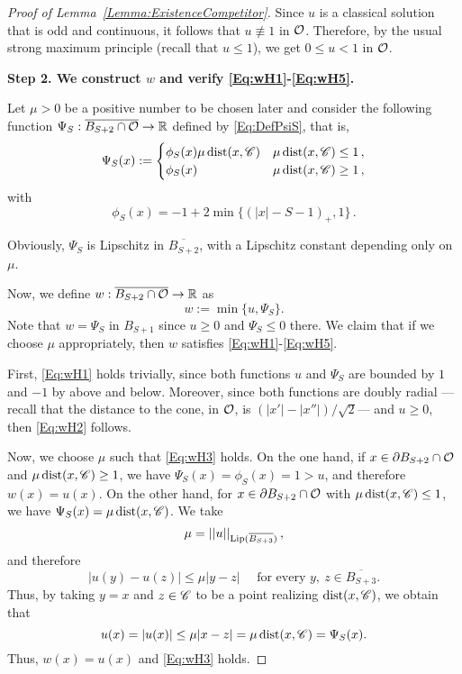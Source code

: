 \begin{proof}[Proof of Lemma~\ref{Lemma:ExistenceCompetitor}]
	Since $u$ is a classical solution that is odd and continuous, it follows that $u \not \equiv 1$ in $\mathcal{O}$. Therefore, by the usual strong maximum principle (recall that $u\leq 1$), we get $0\leq u < 1$ in $\mathcal{O}$. 
	
	\medskip
	
	\textbf{Step 2. We construct $w$ and verify \eqref{Eq:wH1}-\eqref{Eq:wH5}.} 
	
	Let $\mu>0$ be a positive number to be chosen later and consider the following function $\Psi_S:\overline{B_{S+2} \cap \mathcal{O}} \to \mathbb{R}$ defined by \eqref{Eq:DefPsiS}, that is, 
	$$
	\Psi_S(x) :=
	\begin{cases}
	\phi_S (x) \mu\operatorname{dist}(x,\mathscr{C}) &  \mu\operatorname{dist}(x,\mathscr{C}) \leq 1 \,, \\
	\phi_S (x) &  \mu\operatorname{dist}(x,\mathscr{C}) \geq 1\,,
	\end{cases}
	$$
	with 
	$$
	\phi_S (x) =-1+2\min\{(|x|-S-1)_+,1\}\,.
	$$
	
	Obviously, $\Psi_S$ is Lipschitz in $\overline{B_{S+2}}$, with a Lipschitz constant depending only on $\mu$.
	
	Now, we define $w:\overline{B_{S+2} \cap \mathcal{O}} \to \mathbb{R}$ as
	$$
	w:= \min \{u, \Psi_S\}.
	$$
	Note that $w=\Psi_S$ in $B_{S+1}$ since $u\geq 0$ and $\Psi_S\leq 0$ there.	We claim that if we choose $\mu$ appropriately, then $w$ satisfies \eqref{Eq:wH1}-\eqref{Eq:wH5}. 
	
	First, \eqref{Eq:wH1} holds trivially, since both functions $u$ and $\Psi_S$ are bounded by $1$ and $-1$ by above and below. Moreover, since both functions are doubly radial ---recall that the distance to the cone, in $\mathcal{O}$, is $(|x'|-|x''|)/\sqrt{2}$--- and $u\geq0$, then \eqref{Eq:wH2} follows.
	
	Now, we choose $\mu$ such that \eqref{Eq:wH3} holds. On the one hand, if $x\in \partial B_{S+2}\cap \mathcal{O}$ and $\mu\operatorname{dist}(x,\mathscr{C}) \geq 1$, we have $\Psi_S (x) = \phi_S(x) = 1 > u$, and therefore $w(x) = u(x)$. On the other hand, for $x\in \partial B_{S+2}\cap \mathcal{O}$ with $\mu\operatorname{dist}(x,\mathscr{C}) \leq 1$, we have $\Psi_S (x) = \mu \operatorname{dist} (x,\mathscr{C})$. We take  
	\begin{equation} 
	\label{Eq:ChoiceMu} 
	\mu = \left | \left |{u} \right | \right |_{\mathrm{Lip}(\overline{B_{S+3}})}, 
	\end{equation} 
	and therefore
	$$ 
	|u(y) - u(z)|\leq \mu |y-z| \quad \text{ for every } y, \ z \in \overline{B_{S+3}}. 
	$$ 
	Thus, by taking $y=x$ and  $z\in \mathscr{C}$ to be a point realizing $\operatorname{dist}(x,\mathscr{C})$, we obtain that
	$$ 
	u(x) = |u(x)|\leq \mu |x-z|  = \mu \operatorname{dist} (x,\mathscr{C}) = \Psi_S (x).
	$$ 
	Thus, $w(x) = u(x)$ and \eqref{Eq:wH3} holds.
	

\end{proof}
